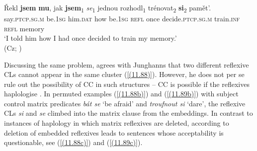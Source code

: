 \begin{exe}\ex\label{(11.87)}
\gll Řekl \textbf{jsem} \textbf{mu}, jak \textbf{jsem}\textsubscript{1} \textit{se}\textsubscript{1} jednou rozhodl\textsubscript{1} trénovat\textsubscript{2} \textbf{si}\textsubscript{2} pamět’. \\
say.\textsc{ptcp}.\textsc{sg}.\textsc{m} be.1\textsc{sg} him.\textsc{dat} how be.1\textsc{sg} \textsc{refl} once decide.\textsc{ptcp}.\textsc{sg}.\textsc{m} train.\textsc{inf} \textsc{refl} memory\\
\glt ‘I told him how I had once decided to train my memory.’ \\
\hfill (Cz; \citealt[80]{Junghanns02})
\end{exe}

\noindent Discussing the same problem, \citet[106]{Rosen14} agrees with Junghanns that two different reflexive CLs cannot appear in the same cluster (\ref{(11.88)}). However, he does not per se rule out the possibility of CC in such structures – CC is possible if the reflexives haplologise \citep[cf.][106]{Rosen14}. In permuted examples (\ref{(11.88b)}) and (\ref{(11.89b)}) with subject control matrix predicates \textit{bát se} ‘be afraid’ and \textit{troufnout si} ‘dare’, the reflexive CLs \textit{si} and \textit{se} climbed into the matrix clause from the embeddings. In contrast to instances of haplology in which matrix reflexives are deleted, according to \citet[106]{Rosen14} deletion of embedded reflexives leads to sentences whose acceptability is questionable, see (\ref{(11.88c)}) and (\ref{(11.89c)}). 


